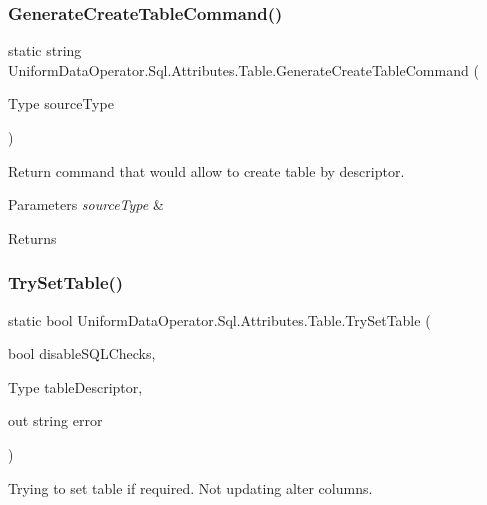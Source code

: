 \subsubsection{\texorpdfstring{Generate\+Create\+Table\+Command()}{GenerateCreateTableCommand()}}
{\footnotesize\ttfamily static string Uniform\+Data\+Operator.\+Sql.\+Attributes.\+Table.\+Generate\+Create\+Table\+Command (\begin{DoxyParamCaption}\item[{Type}]{source\+Type }\end{DoxyParamCaption})\hspace{0.3cm}{\ttfamily [static]}}



Return command that would allow to create table by descriptor. 


\begin{DoxyParams}{Parameters}
{\em source\+Type} & \\
\hline
\end{DoxyParams}
\begin{DoxyReturn}{Returns}

\end{DoxyReturn}
\mbox{\label{class_uniform_data_operator_1_1_sql_1_1_attributes_1_1_table_a80d799a2ba3419b489b9840f624880ff}} 
\subsubsection{\texorpdfstring{Try\+Set\+Table()}{TrySetTable()}}
{\footnotesize\ttfamily static bool Uniform\+Data\+Operator.\+Sql.\+Attributes.\+Table.\+Try\+Set\+Table (\begin{DoxyParamCaption}\item[{bool}]{disable\+S\+Q\+L\+Checks,  }\item[{Type}]{table\+Descriptor,  }\item[{out string}]{error }\end{DoxyParamCaption})\hspace{0.3cm}{\ttfamily [static]}}



Trying to set table if required. Not updating alter columns. 


